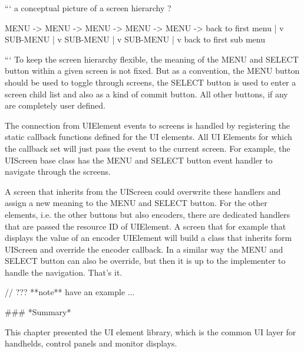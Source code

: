 ```
a conceptual picture of a screen hierarchy ?

MENU -> MENU -> MENU -> MENU -> MENU -> back to first menu
  |
  v
SUB-MENU
   |
   v
SUB-MENU
   |
   v
SUB-MENU
  |
  v
  back to first sub menu

```
To keep the screen hierarchy flexible, the meaning of the MENU and SELECT button within a given screen is not fixed. But as a convention, the MENU button should be used to toggle through screens, the SELECT button is used to enter a screen child list and also as a kind of commit button. All other buttons, if any are completely user defined.

The connection from UIElement events to screens is handled by registering the static callback functions defined for the UI elements. All UI Elements for which the callback set will just pass the event to the current screen. For example, the UIScreen base class has the MENU and SELECT button event handler to navigate through the screens.

A screen that inherits from the UIScreen could overwrite these handlers and assign a new meaning to the MENU and SELECT button. For the other elements, i.e. the other buttons but also encoders, there are dedicated handlers that are passed the resource ID of UIElement. A screen that for example that displays the value of an encoder UIElement will build a class that inherits form UIScreen and override the encoder callback. In a similar way the MENU and SELECT button can also be override, but then it is up to the implementer to handle the navigation. That's it.

// ??? **note** have an example ...

### *Summary*

This chapter presented the UI element library, which is the common UI layer for handhelds, control panels and monitor displays.
